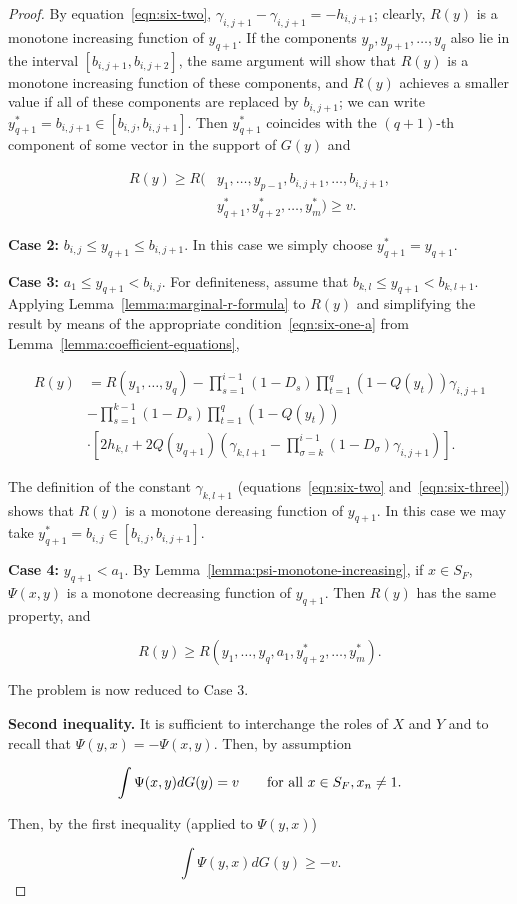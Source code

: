 \documentclass{article}
\theoremstyle{remark}
\begin{document}
\begin{proof}
By equation~\ref{eqn:six-two}, $\gamma_{i, j+1} - \gamma_{i, j+1} = -h_{i,
j+1}$; clearly, $R(y)$ is a monotone increasing function of $y_{q+1}$. If the
components $y_p, y_{p+1}, \dots, y_q$ also lie in the interval $[b_{i, j+1},
b_{i, j+2}]$, the same argument will show that $R(y)$ is a monotone increasing
function of these components, and $R(y)$ achieves a smaller value if all of
these components are replaced by $b_{i, j+1}$; we can write $y_{q+1}^* = b_{i,
j+1} \in [b_{i, j}, b_{i, j+1}]$. Then $y_{q+1}^*$ coincides with the
$(q+1)$-th component of some vector in the support of $G(y)$ and

\[
\begin{aligned}
R(y) \geq R(&y_1, \dots, y_{p-1}, b_{i, j+1}, \dots, b_{i, j+1}, \\
&y^*_{q+1}, y^*_{q+2}, \dots, y^*_{m}) \geq v.
\end{aligned}
\]

\textbf{Case 2:} $b_{i, j} \leq y_{q+1} \leq b_{i, j+1}$. In this case we
simply choose $y^*_{q+1} = y_{q+1}$.

\textbf{Case 3:} $a_1 \leq y_{q+1} < b_{i,j}$. For definiteness, assume that
$b_{k, l} \leq y_{q+1} < b_{k, l+1}$. Applying
Lemma~\ref{lemma:marginal-r-formula} to $R(y)$ and simplifying the result by
means of the appropriate condition~\ref{eqn:six-one-a} from
Lemma~\ref{lemma:coefficient-equations},

\[
\begin{aligned}
R(y) &= R(y_1, \dots, y_q) - \prod_{s=1}^{i-1} (1-D_s) \prod_{t=1}^q (1-Q(y_t))
\gamma_{i, j+1} \\
&- \prod_{s=1}^{k-1} (1-D_s) \prod_{t=1}^q (1-Q(y_t)) \\
& \cdot \left [ 2h_{k,l} + 2Q(y_{q+1}) \left ( \gamma_{k, l+1} -
\prod_{\sigma=k}^{i-1} (1-D_{\sigma}) \gamma_{i, j+1} \right ) \right ].
\end{aligned}
\]

The definition of the constant $\gamma_{k, l+1}$ (equations~\ref{eqn:six-two}
and~\ref{eqn:six-three}) shows that $R(y)$ is a monotone dereasing function of
$y_{q+1}$. In this case we may take $y^*_{q+1} = b_{i, j} \in [b_{i,j}, b_{i,
j+1}]$.

\textbf{Case 4:} $y_{q+1} < a_1$. By Lemma~\ref{lemma:psi-monotone-increasing},
if $x \in S_F$, $\Psi(x, y)$ is a monotone decreasing function of $y_{q+1}$.
Then $R(y)$ has the same property, and

\[
R(y) \geq R(y_1, \dots, y_q, a_1, y^*_{q+2}, \dots, y^*_m).
\]

The problem is now reduced to Case 3.

\textbf{Second inequality.} It is sufficient to interchange the roles of $X$
and $Y$ and to recall that $\Psi(y, x) = -\Psi(x, y)$. Then, by assumption

\[
\int \Psi(x, y) dG(y) = v \qquad \textup{for all } x \in S_F, x_n \neq 1.
\]

Then, by the first inequality (applied to $\Psi(y, x)$)

\[
\int \Psi(y, x) dG(y) \geq -v.
\]

\end{proof}
\end{document}
